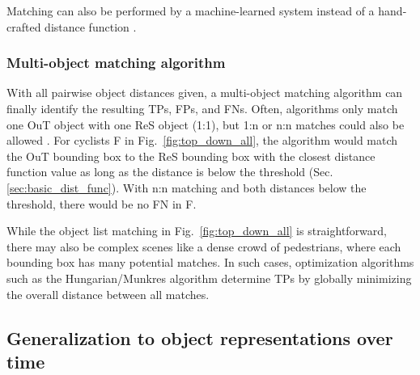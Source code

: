 \documentclass[conference]{IEEEtran}
\begin{document}
Matching can also be performed by a machine-learned system instead of a hand-crafted distance function \cite{Sondell2018}.




\subsubsection{Multi-object matching algorithm}
\label{sec:basic_multi_obj_matching}

With all pairwise object distances given, a multi-object matching algorithm can finally identify the resulting TPs, FPs, and FNs. 
Often, algorithms only match one OuT object with one ReS object (1:1), but 1:n or n:n matches could also be allowed \cite[Sec. 11.3]{Brahmi2020diss}. 
For cyclists F in Fig.~\ref{fig:top_down_all}, the algorithm would match the OuT bounding box to the ReS bounding box with the closest distance function value as long as the distance is below the threshold (Sec. \ref{sec:basic_dist_func}). 
With n:n matching and both distances below the threshold, there would be no FN in F.

While the object list matching in Fig.~\ref{fig:top_down_all} is straightforward, there may also be complex scenes like a dense crowd of pedestrians, where each bounding box has many potential matches. %
In such cases, optimization algorithms such as the Hungarian/Munkres algorithm determine TPs by globally minimizing the overall distance between all matches.


\subsection{Generalization to object representations over time}
\label{sec:oracle_time}
\end{document}
